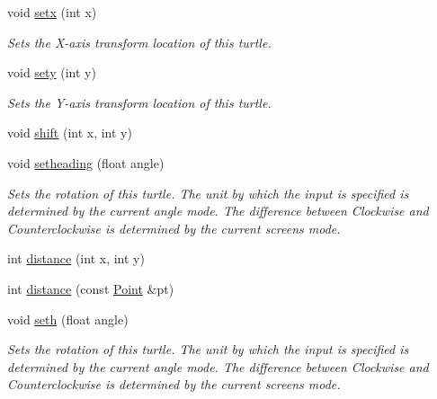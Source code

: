 \begin{DoxyCompactItemize}
\mbox{\label{classcturtle_1_1Turtle_a647d02a7847eef248c45b84251f6639c}} 
void \hyperlink{classcturtle_1_1Turtle_a647d02a7847eef248c45b84251f6639c}{setx} (int x)
\begin{DoxyCompactList}\small\item\em Sets the X-\/axis transform location of this turtle. \end{DoxyCompactList}\item 
\mbox{\label{classcturtle_1_1Turtle_aeee8075a33445d89a060c4faa17f9e5c}} 
void \hyperlink{classcturtle_1_1Turtle_aeee8075a33445d89a060c4faa17f9e5c}{sety} (int y)
\begin{DoxyCompactList}\small\item\em Sets the Y-\/axis transform location of this turtle. \end{DoxyCompactList}\item 
void \hyperlink{classcturtle_1_1Turtle_aea45fc1d0f00b82fc64a0f97dd6c1ea2}{shift} (int x, int y)
\item 
void \hyperlink{classcturtle_1_1Turtle_a4eb2630341ea5bb922c74f214037b361}{setheading} (float angle)
\begin{DoxyCompactList}\small\item\em Sets the rotation of this turtle. The unit by which the input is specified is determined by the current angle mode. The difference between Clockwise and Counterclockwise is determined by the current screen\textquotesingle{}s mode. \end{DoxyCompactList}\item 
int \hyperlink{classcturtle_1_1Turtle_a4a6824b53f70323402d4e972f6da360c}{distance} (int x, int y)
\item 
int \hyperlink{classcturtle_1_1Turtle_aa8b64c7361639dec2eafedaf640a0ebd}{distance} (const \hyperlink{structcturtle_1_1ivec2}{Point} \&pt)
\item 
void \hyperlink{classcturtle_1_1Turtle_a2f578819830001dfb6694813f9a4aa19}{seth} (float angle)
\begin{DoxyCompactList}\small\item\em Sets the rotation of this turtle. The unit by which the input is specified is determined by the current angle mode. The difference between Clockwise and Counterclockwise is determined by the current screen\textquotesingle{}s mode. \end{DoxyCompactList}\item 

\end{DoxyCompactItemize}

